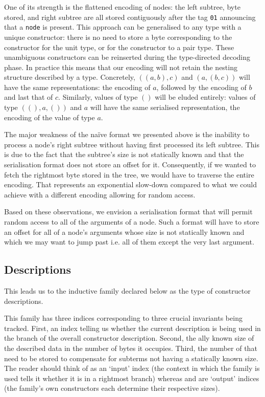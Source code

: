One of its strength is the flattened encoding of nodes:
the left subtree, byte stored, and right subtree are all stored
contiguously after the tag \texttt{01} announcing that a \texttt{node} is present.
%
This approach can be generalised to any type with a unique constructor:
there is no need to store a byte corresponding to the constructor for the
unit type, or for the constructor to a pair type. These unambiguous
constructors can be reinserted during the type-directed decoding phase.
%
In practice this means that our encoding will not retain the nesting
structure described by a type. Concretely, $((a, b), c)$ and $(a, (b, c))$
will have the same representations: the encoding of $a$, followed by the
encoding of $b$ and last that of $c$.
%
Similarly, values of type $()$ will be eluded entirely: values of type
$((), a, ())$ and $a$ will have the same serialised representation, the
encoding of the value of type $a$.


The major weakness of the naïve format we presented above is the
inability to process a node's right subtree without having first
processed its left subtree.
%
This is due to the fact that the subtree's size is not statically
known and that the serialisation format does not store an offset
for it.
%
Consequently, if we wanted to fetch the rightmost byte stored
in the tree, we would have to traverse the entire encoding. That
represents an exponential slow-down compared to what we could achieve
with a different encoding allowing for random access.

Based on these observations, we envision a serialisation format
that will permit random access to all of the arguments of a node.
Such a format will have to store an offset for all of a node's
arguments whose size is not statically known and which we may want
to jump past i.e. all of them except the very last argument.

\subsection{Descriptions}

This leads us to the inductive family  declared below
as the type of constructor descriptions.


This family has three indices corresponding to three crucial
invariants being tracked.
%
First, an index telling us whether the current description
is being used in the  branch of the overall
constructor description.
%
Second, the ally known size of the described data
in the number of bytes it occupies.
%
Third, the number of  that need to be stored to
compensate for subterms not having a statically known size.
%
The reader should think of  as an `input' index
(the context in which the family is used tells it whether it is in
a rightmost branch)
whereas  and  are `output' indices
(the family's own constructors each determine their respective sizes).


